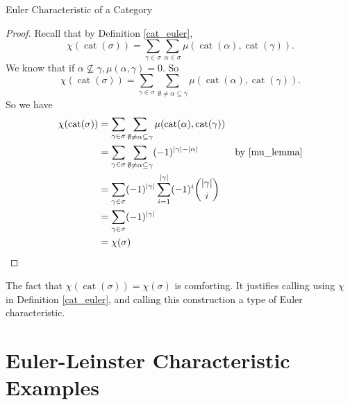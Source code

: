 \documentclass[12pt]{pom_thesis}
\DeclareMathOperator{\cat}{cat}
\begin{document}
\begin{chapter}{Euler Characteristic of a Category}
\begin{thm}
\end{thm}
\begin{proof}
Recall that by Definition \ref{cat_euler}, 
\[
\chi(\cat(\sigma)) = \sum_{\gamma \in \sigma} \sum_{\alpha \in \sigma} \mu(\cat(\alpha), \cat(\gamma)).
\]
We know that if $\alpha \not \subseteq \gamma, \mu(\alpha, \gamma) = 0$. So
\[
\chi(\cat(\sigma)) = \sum_{\gamma \in \sigma} \sum_{\emptyset \neq \alpha \subseteq \gamma}\mu(\cat(\alpha), \cat(\gamma)).
\]
So we have
\begin{align*}
\chi(\cat(\sigma)) &= \sum_{\gamma \in \sigma} \sum_{\emptyset \neq \alpha \subseteq \gamma}\mu(\cat(\alpha), \cat(\gamma))\\
&= \sum_{\gamma \in \sigma} \sum_{\emptyset \neq \alpha \subseteq \gamma}(-1)^{|\gamma| - |\alpha|} &\text{by \ref{mu_lemma}}\\
&= \sum_{\gamma \in \sigma}(-1)^{|\gamma|} \sum_{i = 1}^{|\gamma|} (-1)^i{|\gamma| \choose i}\\
&= \sum_{\gamma \in \sigma} (-1)^{|\gamma|} \\
&= \chi(\sigma)
\end{align*}
\end{proof}
The fact that $\chi(\cat(\sigma)) = \chi(\sigma)$ is comforting. It justifies calling using $\chi$ in Definition \ref{cat_euler}, and calling this construction a type of Euler characteristic.

\section{Euler-Leinster Characteristic Examples}

\end{chapter}
\end{document}
